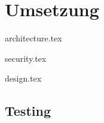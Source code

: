 \begin{comment}
(Implementierung) Architektur und Design beschrieben: Mit begründeten Architekturentscheidungen, mit Diskussion, wie Qualitätsattribute sichergestellt wurden (welche Qualität wurde erreicht?), mit Dokumentation, welche Experimente/Tests durchgeführt wurden und welche Lösungsoptionen aufgrund der Ergebnisse dieser Experimente/Tests
verworfen wurden (was ging schief?)
\end{comment}

\chapter{Umsetzung}

\xxx

{architecture.tex}

\clearpage
{security.tex}

\clearpage
{design.tex}

\clearpage
\section{Testing}

